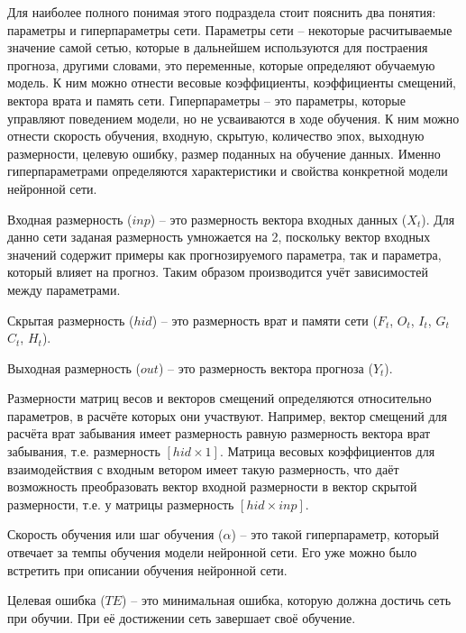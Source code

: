 {\gostFont

  \par \redline Для наиболее полного понимая этого подраздела стоит пояснить два понятия: параметры и гиперпараметры сети. Параметры сети {--} некоторые расчитываемые значение самой сетью, которые в дальнейшем используются для постраения прогноза, другими словами, это переменные, которые определяют обучаемую модель. К ним можно отнести весовые коэффициенты, коэффициенты смещений, вектора врата и память сети. Гиперпараметры {--} это параметры, которые управляют поведением модели, но не усваиваются в ходе обучения. К ним можно отнести скорость обучения, входную, скрытую, количество эпох, выходную размерности, целевую ошибку, размер поданных на обучение данных. Именно гиперпараметрами определяются характеристики и свойства конкретной модели нейронной сети.

  \par \redline Входная размерность ($inp$) {--} это размерность вектора входных данных ($X_t$). Для данно сети заданая размерность умножается на 2, поскольку вектор входных значений содержит примеры как прогнозируемого параметра, так и параметра, который влияет на прогноз. Таким образом производится учёт зависимостей между параметрами.

  \par \redline Скрытая размерность ($hid$) {--} это размерность врат и памяти сети ($F_t$, $O_t$, $I_t$, $G_t$ $C_t$, $H_t$). 

  \par \redline Выходная размерность ($out$) {--} это размерность вектора прогноза ($Y_t$).

  \par \redline Размерности матриц весов и векторов смещений определяются относительно параметров, в расчёте которых они участвуют. Например, вектор смещений для расчёта врат забывания имеет размерность равную размерность вектора врат забывания, т.е. размерность $[hid \times 1]$. Матрица весовых коэффициентов для взаимодействия с входным ветором имеет такую размерность, что даёт возможность преобразовать вектор входной размерности в вектор скрытой размерности, т.е. у матрицы размерность $[hid \times inp]$.

  \par \redline Скорость обучения или шаг обучения ($\alpha$) {--} это такой гиперпараметр, который отвечает за темпы обучения модели нейронной сети. Его уже можно было встретить при описании обучения нейронной сети.

  \par \redline Целевая ошибка ($TE$) {--} это минимальная ошибка, которую должна достичь сеть при обучии. При её достижении сеть завершает своё обучение.

}
